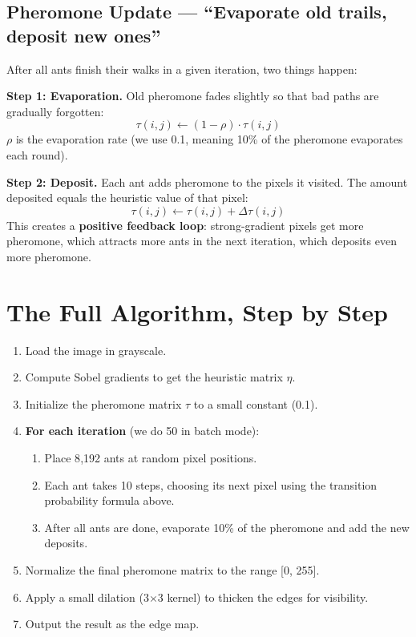 \documentclass[12pt,a4paper]{article}
\begin{document}
\subsection{Pheromone Update --- ``Evaporate old trails, deposit new ones''}
After all ants finish their walks in a given iteration, two things happen:

\textbf{Step 1: Evaporation.} Old pheromone fades slightly so that bad paths are gradually forgotten:
\begin{equation}
    \tau(i,j) \leftarrow (1 - \rho) \cdot \tau(i,j)
\end{equation}
$\rho$ is the evaporation rate (we use 0.1, meaning 10\% of the pheromone evaporates each round).

\textbf{Step 2: Deposit.} Each ant adds pheromone to the pixels it visited. The amount deposited equals the heuristic value of that pixel:
\begin{equation}
    \tau(i,j) \leftarrow \tau(i,j) + \Delta \tau(i,j)
\end{equation}
This creates a \textbf{positive feedback loop}: strong-gradient pixels get more pheromone, which attracts more ants in the next iteration, which deposits even more pheromone.

\section{The Full Algorithm, Step by Step}

\begin{enumerate}
    \item Load the image in grayscale.
    \item Compute Sobel gradients to get the heuristic matrix $\eta$.
    \item Initialize the pheromone matrix $\tau$ to a small constant (0.1).
    \item \textbf{For each iteration} (we do 50 in batch mode):
    \begin{enumerate}
        \item Place 8{,}192 ants at random pixel positions.
        \item Each ant takes 10 steps, choosing its next pixel using the transition probability formula above.
        \item After all ants are done, evaporate 10\% of the pheromone and add the new deposits.
    \end{enumerate}
    \item Normalize the final pheromone matrix to the range [0, 255].
    \item Apply a small dilation (3$\times$3 kernel) to thicken the edges for visibility.
    \item Output the result as the edge map.
\end{enumerate}
\end{document}
